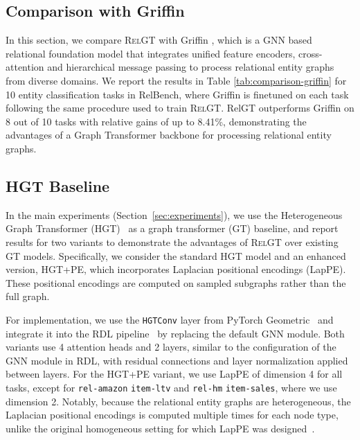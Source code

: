 \documentclass{article} %
\newcommand{\RelGT}{\textsc{RelGT}\xspace}
\begin{document}
\subsection{Comparison with Griffin}
In this section, we compare \RelGT with Griffin \citep{wang2025griffin}, which is a GNN based relational foundation model that integrates unified feature encoders, cross-attention and hierarchical message passing to process relational entity graphs from diverse domains. We report the results in Table \ref{tab:comparison-griffin} for 10 entity classification tasks in RelBench, where Griffin is finetuned on each task following the same procedure used to train \RelGT. RelGT outperforms Griffin on 8 out of 10 tasks with relative gains of up to 8.41\%, demonstrating the advantages of a Graph Transformer backbone for processing relational entity graphs.






\subsection{HGT Baseline}
\label{sec:hgt-baseline}

In the main experiments (Section~\ref{sec:experiments}), we use the Heterogeneous Graph Transformer (HGT)~\citep{hu2020heterogeneous} as a graph transformer (GT) baseline, and report results for two variants to demonstrate the advantages of \RelGT over existing GT models. Specifically, we consider the standard HGT model and an enhanced version, HGT+PE, which incorporates Laplacian positional encodings (LapPE). These positional encodings are computed on sampled subgraphs rather than the full graph.

For implementation, we use the \texttt{HGTConv} layer from PyTorch Geometric~\citep{fey2019fast} and integrate it into the RDL pipeline~\citep{robinson2025relbench} by replacing the default GNN module. Both variants use 4 attention heads and 2 layers, similar to the configuration of the GNN module in RDL, with residual connections and layer normalization applied between layers. 
For the HGT+PE variant, we use LapPE of dimension 4 for all tasks, except for \texttt{rel-amazon} \texttt{item-ltv} and \texttt{rel-hm} \texttt{item-sales}, where we use dimension 2. Notably, because the relational entity graphs are heterogeneous, the Laplacian positional encodings is computed multiple times for each node type, unlike the original homogeneous setting for which LapPE was designed~\citep{dwivedi2020benchmarking}.
\end{document}
